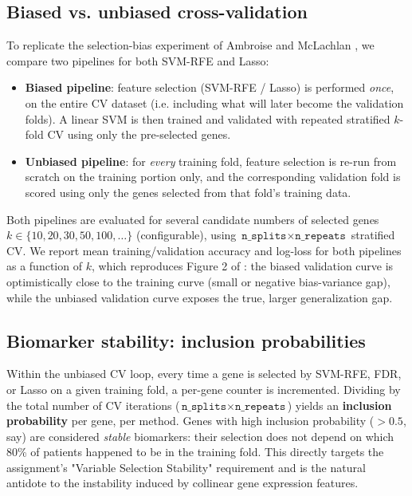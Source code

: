 \documentclass[11pt,a4paper]{article}
\begin{document}
\subsection{Biased vs. unbiased cross-validation}
To replicate the selection-bias experiment of Ambroise and McLachlan \cite{ambroise2002selection}, we compare two pipelines for both SVM-RFE and Lasso:

\begin{itemize}
    \item \textbf{Biased pipeline}: feature selection (SVM-RFE / Lasso) is performed \emph{once}, on the entire CV dataset (i.e. including what will later become the validation folds). A linear SVM is then trained and validated with repeated stratified $k$-fold CV using only the pre-selected genes.
    \item \textbf{Unbiased pipeline}: for \emph{every} training fold, feature selection is re-run from scratch on the training portion only, and the corresponding validation fold is scored using only the genes selected from that fold's training data.
\end{itemize}

Both pipelines are evaluated for several candidate numbers of selected genes $k \in \{10, 20, 30, 50, 100, \dots\}$ (configurable), using $\texttt{n\_splits}\times\texttt{n\_repeats}$ stratified CV.
We report mean training/validation accuracy and log-loss for both pipelines as a function of $k$, which reproduces Figure 2 of \cite{ambroise2002selection}: the biased validation curve is optimistically close to the training curve (small or negative bias-variance gap), while the unbiased validation curve exposes the true, larger generalization gap.

\subsection{Biomarker stability: inclusion probabilities}
Within the unbiased CV loop, every time a gene is selected by SVM-RFE, FDR, or Lasso on a given training fold, a per-gene counter is incremented.
Dividing by the total number of CV iterations ($\texttt{n\_splits}\times\texttt{n\_repeats}$) yields an
\textbf{inclusion probability} per gene, per method.
Genes with high inclusion probability ($>0.5$, say) are considered \emph{stable} biomarkers: their selection does not depend on which 80\% of patients happened to be in the training fold.
This directly targets the assignment's "Variable Selection Stability" requirement and is the natural antidote to the instability induced by collinear gene expression features.
\end{document}
